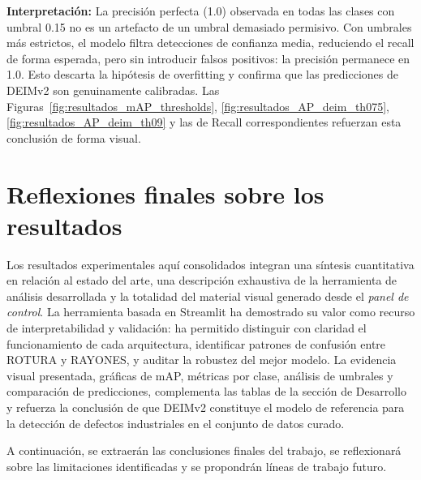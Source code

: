 \textbf{Interpretación:} La precisión perfecta (1.0) observada en todas las clases con umbral 0.15 no es un artefacto de un umbral demasiado permisivo. Con umbrales más estrictos, el modelo filtra detecciones de confianza media, reduciendo el recall de forma esperada, pero sin introducir falsos positivos: la precisión permanece en 1.0. Esto descarta la hipótesis de overfitting y confirma que las predicciones de DEIMv2 son genuinamente calibradas. Las Figuras~\ref{fig:resultados_mAP_thresholds}, \ref{fig:resultados_AP_deim_th075}, \ref{fig:resultados_AP_deim_th09} y las de Recall correspondientes refuerzan esta conclusión de forma visual.


\section{Reflexiones finales sobre los resultados}
\label{sec:reflexiones_finales}

Los resultados experimentales aquí consolidados integran una síntesis cuantitativa en relación al estado del arte, una descripción exhaustiva de la herramienta de análisis desarrollada y la totalidad del material visual generado desde el \textit{panel de control}. La herramienta basada en \acrshort{Streamlit} ha demostrado su valor como recurso de interpretabilidad y validación: ha permitido distinguir con claridad el funcionamiento de cada arquitectura, identificar patrones de confusión entre ROTURA y RAYONES, y auditar la robustez del mejor modelo. La evidencia visual presentada, gráficas de mAP, métricas por clase, análisis de umbrales y comparación de predicciones, complementa las tablas de la sección de Desarrollo y refuerza la conclusión de que DEIMv2 constituye el modelo de referencia para la detección de defectos industriales en el conjunto de datos curado.

A continuación, se extraerán las conclusiones finales del trabajo, se reflexionará sobre las limitaciones identificadas y se propondrán líneas de trabajo futuro.
